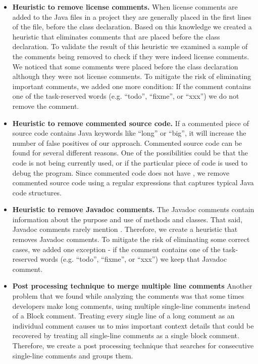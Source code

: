  
\begin{itemize}


\item{\textbf{Heuristic to remove license comments.}} 
When license comments are added to the Java files in a project they are generally placed in the first lines of the file, before the class declaration. Based on this knowledge we created a heuristic that eliminates comments that are placed before the class declaration. To validate the result of this heuristic we examined a sample of the comments being removed to check if they were indeed license comments. We noticed that some comments were placed before the class declaration although they were not license comments. To mitigate the risk of eliminating important comments, we added one more condition: If the comment contains one of the task-reserved words (e.g. ``todo'', ``fixme'', or ``xxx'') we do not remove the comment.

\item{\textbf{Heuristic to remove commented source code.}}
If a commented piece of source code contains Java keywords like ``long'' or ``big'', it will increase the number of false positives of our approach. Commented source code can be found for several different reasons. One of the possibilities could be that the code is not being currently used, or if the particular piece of code is used to debug the program. Since commented code does not have \SADTD, we remove commented source code using a regular expressions that captures typical Java code structures.

\item{\textbf{Heuristic to remove Javadoc comments.}}
The Javadoc comments contain information about the purpose and use of methods and classes. That said, Javadoc comments rarely mention \SADTD. Therefore, we create a heuristic that removes Javadoc comments. To mitigate the risk of eliminating some correct cases, we added one exception - if the comment contains one of the task-reserved words (e.g. ``todo'', ``fixme'', or ``xxx'') we keep that Javadoc comment. 

\item{\textbf{Post processing technique to merge multiple line comments}}
Another problem that we found while analyzing the comments was that some times developers make long comments, using multiple single-line comments instead of a Block comment. Treating every single line of a long comment as an individual comment causes us to miss important context details that could be recovered by treating all single-line comments as a single block comment. Therefore, we create a post processing technique that searches for consecutive single-line comments and groups them. 

\end{itemize}

